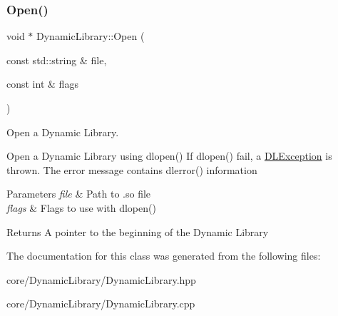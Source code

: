 \subsubsection{\texorpdfstring{Open()}{Open()}}
{\footnotesize\ttfamily void $\ast$ Dynamic\+Library\+::\+Open (\begin{DoxyParamCaption}\item[{const std\+::string \&}]{file,  }\item[{const int \&}]{flags }\end{DoxyParamCaption})}



Open a Dynamic Library. 

Open a Dynamic Library using {\ttfamily dlopen()} If {\ttfamily dlopen()} fail, a \hyperlink{class_d_l_exception}{D\+L\+Exception} is thrown. The error message contains {\ttfamily dlerror()} information


\begin{DoxyParams}{Parameters}
{\em file} & Path to .so file \\
\hline
{\em flags} & Flags to use with {\ttfamily dlopen()}\\
\hline
\end{DoxyParams}
\begin{DoxyReturn}{Returns}
A pointer to the beginning of the Dynamic Library 
\end{DoxyReturn}


The documentation for this class was generated from the following files\+:\begin{DoxyCompactItemize}
\item 
core/\+Dynamic\+Library/Dynamic\+Library.\+hpp\item 
core/\+Dynamic\+Library/Dynamic\+Library.\+cpp\end{DoxyCompactItemize}
